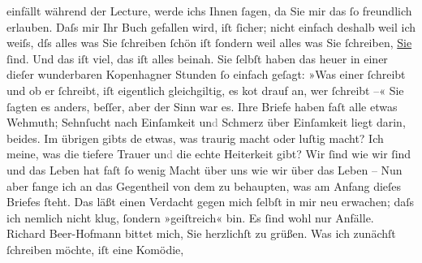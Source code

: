 \begin{ledgroupsized}[t]{13cm}
               einfällt während der Lecture, werde ichs Ihnen ſagen, da Sie mir das ſo freundlich
               erlauben. Daſs {\pb}mir Ihr Buch gefallen wird, iſt
               ſicher; nicht einfach deshalb weil ich weiſs, dſs alles was Sie ſchreiben ſchön iſt
               ſondern weil alles was Sie ſchreiben, \uline{Sie}{ }ſind. Und das iſt viel, das iſt alles beinah. Sie
               ſelbſt haben das heuer in einer dieſer wunderbaren Kopenhagner Stunden ſo einfach geſagt: »Was einer ſchreibt und ob er
               ſchreibt, iſt eigentlich gleichgiltig, es ko{\geminationm}t drauf an,
               wer ſchreibt –« Sie ſagten es anders, beſſer, aber der Sinn {\pb}war es.\pend
           \pstart
           Ihre Briefe haben faſt alle etwas Wehmuth; Sehnſucht nach Einſamkeit
                  un\textcolor{gray}{d}{ }Schmerz über Einſamkeit liegt darin, beides. Im
               übrigen gibts de{\geminationn} etwas, was traurig macht oder luſtig
               macht? Ich meine, was die tiefere Trauer un\textcolor{gray}{d} die echte Heiterkeit
               gibt? Wir ſind wie wir ſind und das Leben hat faſt ſo wenig Macht über uns wie wir
               über das Leben – Nun aber fange ich an das Gegentheil von dem zu behaupten, {\pb}was am Anfang dieſes Briefes ſteht. Das läßt einen
               Verdacht gegen mich ſelbſt in mir neu erwachen; daſs ich nemlich nicht klug, ſondern
               »geiſtreich« bin. Es ſind wohl nur Anfälle.\pend
           \pstart
           Richard Beer-Hofmann bittet mich, Sie herzlichſt
               zu grüßen.\pend
           \pstart
           Was ich zunächſt ſchreiben möchte, iſt eine Komödie, \label{K_L00643_1v}
\end{ledgroupsized}
